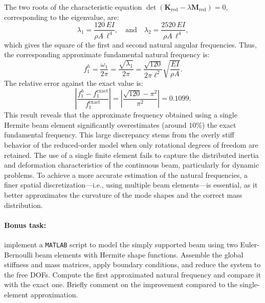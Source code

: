 \documentclass[12pt]{article}
\begin{document}
The two roots of the characteristic equation $\det(\mathbf{K}_\text{red} - \lambda \mathbf{M}_\text{red}) = 0$, corresponding to the eigenvalue, are:
$$
    \lambda_1 = \frac{120\, EI}{\rho A\, \ell^4},\quad \text{and}\quad \lambda_2 = \frac{2520\, EI}{\rho A\, \ell^4},
$$
which gives the square of the first and second natural angular frequencies. Thus, the corresponding approximate fundamental natural frequency is:
\[
    f_1^h  = \frac{\omega_1}{2\pi} = \frac{\sqrt{\lambda_1}}{2\pi}=\frac{\sqrt{120}}{2\pi\ell^2}\sqrt{ \frac{EI}{\rho A} }.
\]
The relative error against the exact value is:
$$\left| \frac{f_1^h - f_1^\text{exact}}{f_1^\text{exact}} \right|
    = \left| \frac{\sqrt{120} - \pi^2}{\pi^2} \right|=0.1099.$$
This result reveals that the approximate frequency obtained using a single Hermite beam element significantly overestimates (around $10\%$) the exact fundamental frequency. This large discrepancy stems from the overly stiff behavior of the reduced-order model when only rotational degrees of freedom are retained. The use of a single finite element fails to capture the distributed inertia and deformation characteristics of the continuous beam, particularly for dynamic problems. To achieve a more accurate estimation of the natural frequencies, a finer spatial discretization—i.e., using multiple beam elements—is essential, as it better approximates the curvature of the mode shapes and the correct mass distribution.

\paragraph{Bonus task:} implement a \texttt{MATLAB} script to model the simply supported beam using two Euler-Bernoulli beam elements with Hermite shape functions. Assemble the global stiffness and mass matrices, apply boundary conditions, and reduce the system to the free DOFs. Compute the first approximated natural frequency and compare it with the exact one. Briefly comment on the improvement compared to the single-element approximation.
\end{document}
